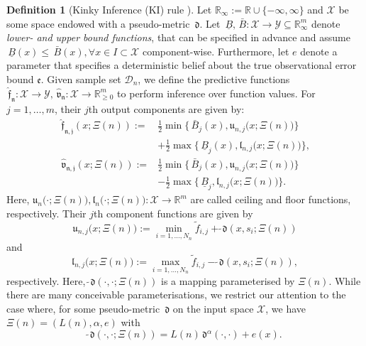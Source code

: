 \documentclass{article} %
\theoremstyle{definition}
\newtheorem{defn}[thm]{Definition}
\theoremstyle{remark}
\newcommand{\Real}{\mathbb R}
\newcommand{\data}{\ensuremath{ \mathcal D} }
\newcommand{\param}{\ensuremath{\Xi}}%
\newcommand{\inspace}{\ensuremath{ \mathcal X}}
\newcommand{\outspace}{\ensuremath{ \mathcal Y}}
\newcommand{\metric}{\, \mathfrak{d}} %
\newcommand{\predfn}{\, \mathfrak{  \hat f_n}} %
\newcommand{\predfnj}{\, \mathfrak{  \hat f_{n,j}}} %
\newcommand{\prederrn}{\, \mathfrak{\hat v_n}} %
\newcommand{\prederrnj}{\, \mathfrak{\hat v_{n,j}}} %
\newcommand{\hexp}{{ \alpha }}%
\newcommand{\ubf}{\, {\bar B}} %
\newcommand{\lbf}{\, {\underline{B}}} %
\newcommand{\obserrpar}{e} %
\newcommand{\obserr}{\mathfrak e} %
\newcommand{\decke}{\ensuremath{\mathfrak u}}
\newcommand{\boden}{\ensuremath{\mathfrak l}}
\begin{document}
\begin{defn}[Kinky Inference (KI) rule ] \label{def:KIL}
Let  $\Real_\infty := \Real \cup\{- \infty, \infty\}$ and $\inspace$ be some space endowed with a pseudo-metric $\metric$. Let $\lbf,\ubf: \inspace \to \outspace \subseteq \Real_\infty^m$ denote \textit{lower- and upper bound functions}, that can be specified in advance and assume $\lbf(x) \leq \ubf(x), \forall x \in I \subset \inspace$ component-wise. 
Furthermore, let $\obserrpar$ denote a parameter that specifies a deterministic belief about the true observational error bound $\obserr$.
Given sample set $\data_n$, we define the predictive functions $\predfn: \inspace \to \outspace, \prederrn: \inspace \to \Real^m_{\geq 0}$ to perform inference over function values.
For $j=1,\ldots,m$, their $j$th output components are given by:
	\begin{align*}
   \predfnj(x; \param(n)) :=& \frac{1}{2} \min\{ \ubf_j(x), \decke_{n,j}(x;\param(n)\bigr)\} \\
    &+ \frac{1}{2} \max\{ \lbf_j(x), \boden_{n,j}(x;\param(n)\bigr) \},\\
	\prederrnj(x; \param(n)) :=& \frac{1}{2} \min\{ \ubf_j(x), \decke_{n,j}\bigl(x;\param(n)\bigr)\} \\
	&- \frac{1}{2} \max\{ \lbf_j, \boden_{n,j}\bigl(x;\param(n)\bigr) \}.
	\end{align*}
	Here, $\decke_n\bigl(\cdot;\param(n)\bigr), \boden_n\bigl(\cdot;\param(n)\bigr): \inspace \to \Real^m$ are called ceiling and floor functions, respectively. Their $j$th component functions are given by
	\[\decke_{n,j}\bigl(x; \param(n)\bigr) := \min_{i=1,\ldots,N_n}   \tilde f_{i,j} +  \tilde \metric(x,s_i;\param(n)) \] and 
	\[\boden_{n,j}\bigl(x; \param(n)\bigr) := \max_{i=1,\ldots,N_n}   \tilde f_{i,j} -  \tilde  \metric(x,s_i;\param(n)),\] respectively.
  Here, $\tilde \metric (\cdot,\cdot;\param(n))$ is a mapping parameterised by $ \param(n)$. While there are many conceivable parameterisations, we restrict our attention to the case where, for some pseudo-metric $\metric$ on the input space $\inspace$, we have $\param(n) = (L(n), \hexp,\obserrpar)$ with $$\tilde \metric(\cdot,\cdot; \param(n)) = L(n) \metric^\hexp(\cdot,\cdot) + \obserrpar(x).$$

\end{defn}
\end{document}
